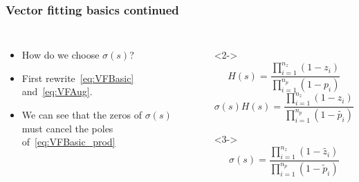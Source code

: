 \begin{frame}
	\frametitle{Vector fitting basics continued}
	\begin{columns}[c]
		\begin{itemize}
				\item<1-> How do we choose $\sigma(s)$?
				\item<2-> First rewrite~\eqref{eq:VFBasic} and~\eqref{eq:VFAug}.
				\item<3-> We can see that the zeros of $\sigma(s)$ must cancel the poles of~\eqref{eq:VFBasic_prod}
		\end{itemize}
			\begin{itemize}
				\item[]<2->
					\begin{equation}
						\label{eq:VFBasic_prod}
						H(s) = \frac{\prod_{i=1}^{n_z}(1-z_i)}{\prod_{i=1}^{n_p}(1-p_i)}
					\end{equation}
					\begin{equation}
						\label{eq:VFAug}
						\sigma(s)H(s) = \frac{\prod_{i=1}^{n_z}(1-z_i)}{\prod_{i=1}^{n_p}(1-\tilde{p_i})}
					\end{equation}
				\item[]<3->
					\begin{equation}
						\label{eq:VFWeight}
						\sigma(s) = \frac{\prod_{i=1}^{n_z}(1-\tilde{z_i})}{\prod_{i=1}^{n_p}(1-\tilde{p}_i)}
					\end{equation}
			\end{itemize}
		\end{columns}
	\end{frame}

